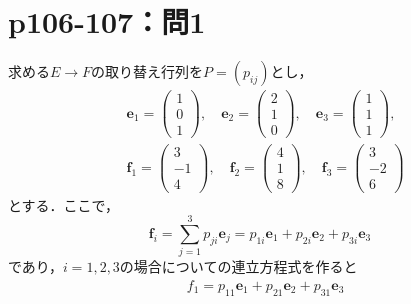 \documentclass[a4paper,10pt,fleqn]{ltjsarticle}
\begin{document}
\section*{p106-107：問1}
\begin{leftbar}
    求める$E\to F$の取り替え行列を$P=(p_{ij})$とし，
    \begin{align*}
         & \bm{e}_1=
        \begin{pmatrix}
            1 \\
            0 \\
            1
        \end{pmatrix}
        ,\quad
        \bm{e}_2=
        \begin{pmatrix}
            2 \\
            1 \\
            0
        \end{pmatrix}
        ,\quad
        \bm{e}_3=
        \begin{pmatrix}
            1 \\
            1 \\
            1
        \end{pmatrix}
        ,            \\
         &
        \bm{f}_1=
        \begin{pmatrix}
            3  \\
            -1 \\
            4
        \end{pmatrix}
        ,\quad
        \bm{f}_2=
        \begin{pmatrix}
            4 \\
            1 \\
            8
        \end{pmatrix}
        ,\quad
        \bm{f}_3=
        \begin{pmatrix}
            3  \\
            -2 \\
            6
        \end{pmatrix}
    \end{align*}
    とする．ここで，
    \[
        \bm{f}_i=\sum^{3}_{j=1}p_{ji}\bm{e}_{j}=p_{1i}\bm{e}_1+p_{2i}\bm{e}_2+p_{3i}\bm{e}_3
    \]
    であり，$i=1,2,3$の場合についての連立方程式を作ると
    \begin{align*}
         & f_1=p_{11}\bm{e}_1+p_{21}\bm{e}_2+p_{31}\bm{e}_3 \\

\end{align*}
\end{leftbar}
\end{document}
